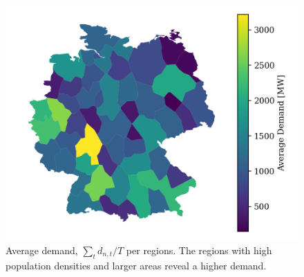 \documentclass[11pt,twocolumn]{article}
\newcommand{\demand}[1][n]{d_{#1,t}}
\begin{document}
\begin{figure}[h]
    \includegraphics[width=\linewidth]{de50/average_demand}
    \caption{Average demand, $\sum_t \demand/T$ per regions. The regions with high population densities and larger areas reveal a higher demand.}
    \label{fig:average_demand}
\end{figure}
\end{document}
